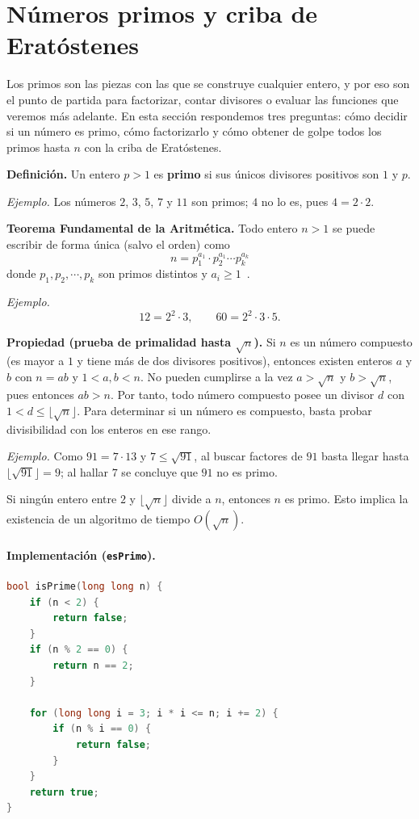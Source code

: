 \section{Números primos y criba de Eratóstenes}

Los primos son las piezas con las que se construye cualquier entero, y por eso son el punto de partida para factorizar, contar divisores o evaluar las funciones que veremos más adelante. En esta sección respondemos tres preguntas: cómo decidir si un número es primo, cómo factorizarlo y cómo obtener de golpe todos los primos hasta $n$ con la criba de Eratóstenes.

\textbf{Definición.} Un entero $p > 1$ es \textbf{primo} si sus únicos divisores positivos son $1$ y $p$.

\textit{Ejemplo.} Los números $2$, $3$, $5$, $7$ y $11$ son primos; $4$ no lo es, pues $4 = 2\cdot 2$.

\textbf{Teorema Fundamental de la Aritmética.} Todo entero $n > 1$ se puede escribir de forma única (salvo el orden) como
$$n=p_1^{a_1} \cdot p_2^{a_1} \cdots p_k^{a_k}$$ donde $p_1,p_2,\cdots,p_k$ son primos distintos y $a_i \geq 1$~\cite{perez_numeros}.

\textit{Ejemplo.}
\[
12 = 2^2 \cdot 3, \qquad 60 = 2^2 \cdot 3 \cdot 5.
\]

\textbf{Propiedad (prueba de primalidad hasta $\sqrt{n}$).} Si $n$ es un número compuesto (es mayor a $1$ y tiene más de dos divisores positivos), entonces existen enteros $a$ y $b$ con $n = ab$ y $1 < a, b < n$. No pueden cumplirse a la vez $a > \sqrt{n}$ y $b > \sqrt{n}$, pues entonces $ab > n$. Por tanto, todo número compuesto posee un divisor $d$ con $1 < d \le \lfloor\sqrt{n}\rfloor$. Para determinar si un número es compuesto, basta probar divisibilidad con los enteros en ese rango.

\textit{Ejemplo.} Como $91 = 7\cdot 13$ y $7 \le \sqrt{91}$, al buscar factores de $91$ basta llegar hasta $\lfloor\sqrt{91}\rfloor = 9$; al hallar $7$ se concluye que $91$ no es primo.

Si ningún entero entre $2$ y $\lfloor\sqrt{n}\rfloor$ divide a $n$, entonces $n$ es primo. Esto implica la existencia de un algoritmo de tiempo $O(\sqrt{n})$.

\paragraph{Implementación (\texttt{esPrimo}).}

\begin{lstlisting}[language=C++]
bool isPrime(long long n) {
    if (n < 2) {
        return false;
    }
    if (n % 2 == 0) {
        return n == 2;
    }

    for (long long i = 3; i * i <= n; i += 2) {
        if (n % i == 0) {
            return false;
        }
    }
    return true;
}
\end{lstlisting}
 
